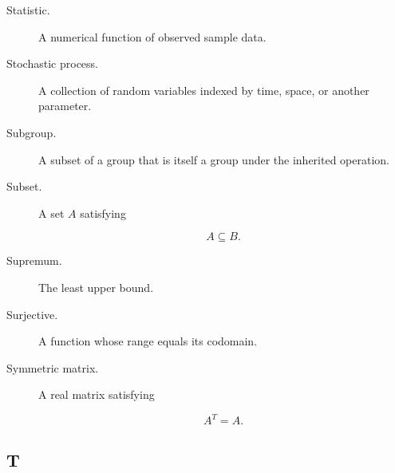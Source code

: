 \begin{description}
\item[Statistic.]
A numerical function of observed sample data.

\item[Stochastic process.]
A collection of random variables indexed by time, space, or another
parameter.

\item[Subgroup.]
A subset of a group that is itself a group under the inherited operation.

\item[Subset.]
A set \(A\) satisfying

\[
A\subseteq B.
\]

\item[Supremum.]
The least upper bound.

\item[Surjective.]
A function whose range equals its codomain.

\item[Symmetric matrix.]
A real matrix satisfying

\[
A^T=A.
\]

\end{description}

\subsection*{T}

